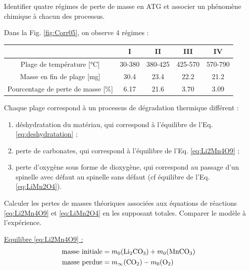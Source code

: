 \documentclass[twoside,a4paper,11pt,addpoints,answers]{exam}%
\begin{document}
\begin{questions}
\question[2] \label{Q:2-07} Identifier quatre régimes de perte de masse en ATG et associer un phénomène chimique à chacun des processus.

\begin{mybox}\begin{solution}[6cm]
Dans la Fig. \ref{fig:Corr05}, on observe 4 régimes :\\ 
\begin{center}
\begin{tabular}{ccccc}
\toprule
& I & II & III & IV \\
\midrule
Plage de température [\si{\celsius}] & 30-380 & 380-425 & 425-570 & 570-790 \\
Masse en fin de plage [\si{\milli\gram}] & 30.4 & 23.4 & 22.2 & 21.2 \\
Pourcentage de perte de masse [\si{\percent}] & 6.17 & 21.6 & 3.70 & 3.09 \\
\bottomrule
\end{tabular}
\end{center}

\hspace{0.5cm}

Chaque plage correspond à un processus de dégradation thermique différent : 
\begin{enumerate}
\item déshydratation du matériau, qui correspond à l'équilibre de l'Eq. \ref{eq:deshydratation} ;
\item perte de carbonates, qui correspond à l'équilibre de l'Eq. \ref{eq:Li2Mn4O9} ;
\item perte d'oxygène sous forme de dioxygène, qui correspond au passage d'un spinelle avec défaut au spinelle sans défaut (cf équilibre de l'Eq. \ref{eq:LiMn2O4}).
\end{enumerate}
\end{solution}\end{mybox}

\question[3] \label{Q:2-11} Calculer les pertes de masses théoriques associées aux équations de réactions \ref{eq:Li2Mn4O9} et \ref{eq:LiMn2O4} en les supposant totales. Comparer le modèle à l'expérience.

\begin{mybox}\begin{solution}[9cm]
\underline{Equilibre \ref{eq:Li2Mn4O9} : }
\begin{align*}
\text{masse initiale} &=  m_0( \ce{Li2CO3} ) + m_0( \ce{MnCO3} )\\
\text{masse perdue} &= m_\infty ( \ce{CO2}) - m_0 ( \ce{O2} )
\end{align*}


\end{solution}
\end{mybox}
\end{questions}
\end{document}
